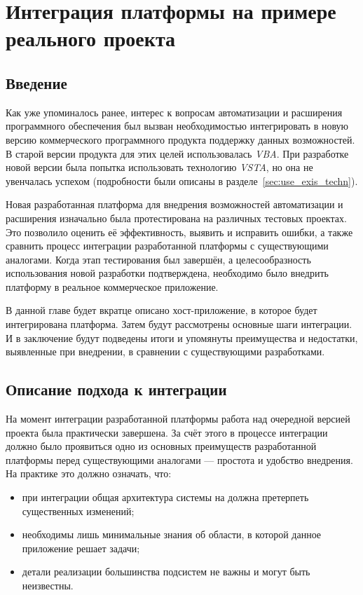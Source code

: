 \section{Интеграция платформы на примере реального проекта}

\subsection{Введение}

Как уже упоминалось ранее, интерес к вопросам автоматизации и расширения программного обеспечения был вызван необходимостью интегрировать в новую версию коммерческого программного продукта поддержку данных возможностей. В старой версии продукта для этих целей использовалась {\it VBA}. При разработке новой версии была попытка использовать технологию {\it VSTA}, но она не увенчалась успехом (подробности были описаны в разделе~\ref{sec:use_exis_techn}).

Новая разработанная платформа для внедрения возможностей автоматизации и расширения изначально была протестирована на различных тестовых проектах. Это позволило оценить её эффективность, выявить и исправить ошибки, а также сравнить процесс интеграции разработанной платформы с существующими аналогами. Когда этап тестирования был завершён, а целесообразность использования новой разработки подтверждена, необходимо было внедрить платформу в реальное коммерческое приложение. 

В данной главе будет вкратце описано хост-приложение, в которое будет интегрирована платформа. Затем будут рассмотрены основные шаги интеграции. И в заключение будут подведены итоги и упомянуты преимущества и недостатки, выявленные при внедрении, в сравнении с существующими разработками.

\subsection{Описание подхода к интеграции}

На момент интеграции разработанной платформы работа над очередной версией проекта была практически завершена. За счёт этого в процессе интеграции должно было проявиться одно из основных преимуществ разработанной платформы перед существующими аналогами --- простота и удобство внедрения. На практике это должно означать, что:
\begin{itemize}
 \item при интеграции общая архитектура системы на должна претерпеть существенных изменений;
 \item необходимы лишь минимальные знания об области, в которой данное приложение решает задачи;
 \item детали реализации большинства подсистем не важны и могут быть неизвестны.
\end{itemize}

